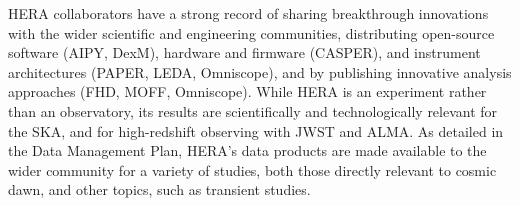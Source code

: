 \documentclass[preprint]{aastex}
\newcommand{\compress}{\vspace{-0.3in}}
\begin{document}
HERA collaborators have a strong record of sharing breakthrough
innovations with the wider scientific and engineering communities, distributing 
open-source software (AIPY, DexM), hardware and firmware (CASPER), 
and instrument architectures (PAPER, LEDA, Omniscope),
and by publishing innovative analysis approaches (FHD, MOFF,
Omniscope).  While HERA is an experiment rather than an observatory, its
results are scientifically and technologically relevant for the
SKA, and for high-redshift observing with JWST and ALMA.
As detailed in the Data Management Plan, HERA's data products are made available to the wider
community for a variety of studies, both those directly
relevant to cosmic dawn, and other topics, such as transient studies. 



\end{document}
